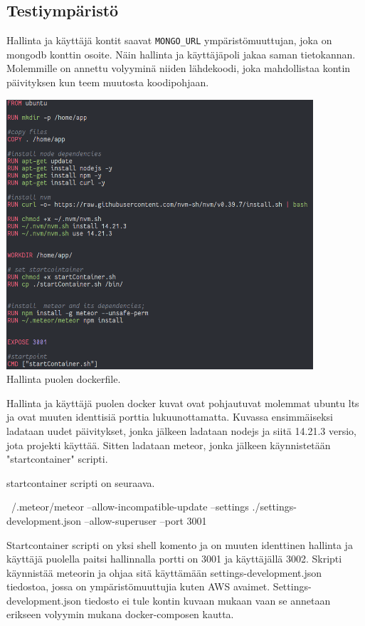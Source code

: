 \medskip


\subsection*{Testiympäristö}


Hallinta ja käyttäjä kontit saavat \verb"MONGO_URL" ympäristömuuttujan, joka on mongodb konttin osoite. Näin hallinta ja käyttäjäpoli jakaa saman tietokannan.
Molemmille on annettu volyyminä niiden lähdekoodi, joka mahdollistaa kontin päivityksen kun teem muutosta koodipohjaan.
\medbreak

\medskip

\includegraphics[height=10cm]{src/public/dockerfile.png} \\
Hallinta puolen dockerfile.
\medskip

Hallinta ja käyttäjä puolen docker kuvat ovat pohjautuvat molemmat ubuntu lts ja ovat muuten identtisiä porttia lukuunottamatta.
Kuvassa ensimmäiseksi ladataan uudet päivitykset, jonka jälkeen ladataan nodejs ja siitä 14.21.3 versio, jota projekti käyttää.
Sitten ladataan meteor, jonka jälkeen käynnistetään "startcontainer"{} scripti.
\medskip

startcontainer scripti on seuraava. 
\medskip
\begin{tcolorbox}
~/.meteor/meteor --allow-incompatible-update --settings ./settings-development.json --allow-superuser --port 3001
\end{tcolorbox}

Startcontainer scripti on yksi shell komento ja on muuten identtinen hallinta ja käyttäjä puolella paitsi hallinnalla portti on 3001 ja käyttäjällä 3002.
Skripti käynnistää meteorin ja ohjaa sitä käyttämään settings-development.json tiedostoa, jossa on ympäristömuuttujia kuten AWS avaimet.
Settings-development.json tiedosto ei tule kontin kuvaan mukaan vaan se annetaan erikseen volyymin mukana docker-composen kautta.
\medskip

